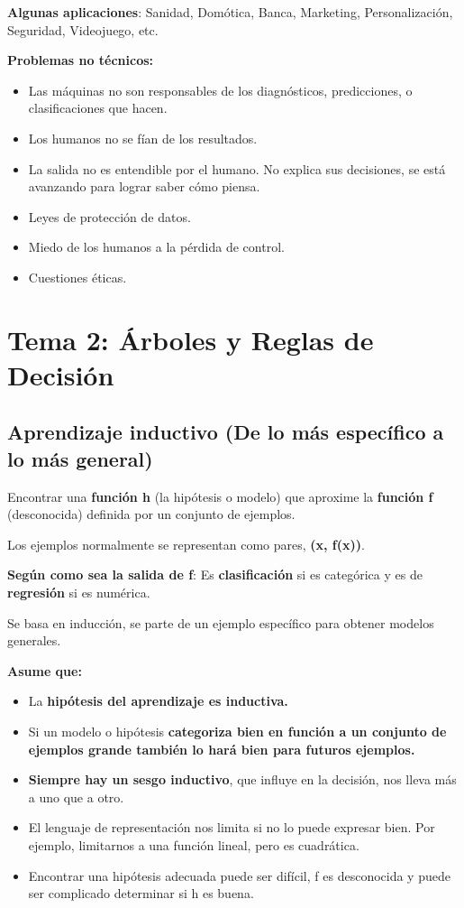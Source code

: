 \documentclass[12pt, twoside, openright]{report} %
\begin{document}
\textbf{Algunas aplicaciones}: Sanidad, Domótica, Banca, Marketing,
Personalización, Seguridad, Videojuego, etc.

\textbf{Problemas no técnicos:}

\begin{itemize}
	\item Las máquinas no son responsables de los diagnósticos, predicciones, o
	      clasificaciones que hacen.
	\item Los humanos no se fían de los resultados.
	\item La salida no es entendible por el humano. No explica sus decisiones,
	      se está avanzando para lograr saber cómo piensa.
	\item Leyes de protección de datos.
	\item Miedo de los humanos a la pérdida de control.
	\item Cuestiones éticas.
\end{itemize}

\chapter{Tema 2: Árboles y Reglas de Decisión}

\section{Aprendizaje inductivo (De lo más específico a lo más general)}

Encontrar una \textbf{función h} (la hipótesis o modelo) que aproxime la \textbf{función f} (desconocida) definida por un conjunto de ejemplos.

Los ejemplos normalmente se representan como pares, \textbf{(x, f(x))}.

\textbf{Según como sea la salida de f}: Es \textbf{clasificación} si es
categórica y es de \textbf{regresión} si es numérica.

Se basa en inducción, se parte de un ejemplo específico para obtener
modelos generales.

\textbf{Asume que:}

\begin{itemize}
	\item La \textbf{hipótesis del aprendizaje es inductiva.}
	\item Si un modelo o hipótesis \textbf{categoriza bien en función a un
		      conjunto de ejemplos grande también lo hará bien para futuros
		      ejemplos.}
	\item \textbf{Siempre hay un sesgo inductivo}, que influye en la decisión,
	      nos lleva más a uno que a otro.
	\item El lenguaje de representación nos limita si no lo puede expresar bien.
	      Por ejemplo, limitarnos a una función lineal, pero es cuadrática.
	\item Encontrar una hipótesis adecuada puede ser difícil, f es desconocida y
	      puede ser complicado determinar si h es buena.
\end{itemize}
\end{document}
